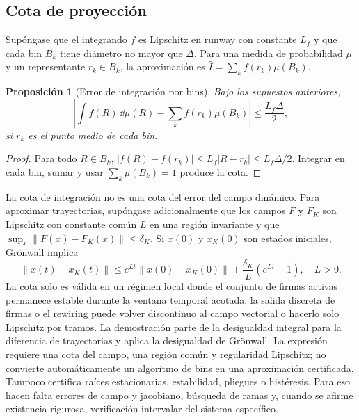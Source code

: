 \documentclass[11pt,a4paper]{article}
\newtheorem{proposition}[theorem]{Proposición}
\begin{document}
\subsection{Cota de proyección}
Supóngase que el integrando $f$ es Lipschitz en runway con constante $L_f$ y que cada bin $B_k$ tiene diámetro no mayor que $\Delta$. Para una medida de probabilidad $\mu$ y un representante $r_k\in B_k$, la aproximación es $\widehat I=\sum_k f(r_k)\mu(B_k)$.
\begin{proposition}[Error de integración por bins]
Bajo los supuestos anteriores,
\begin{equation}
\left|\int f(R)\,\dd\mu(R)-\sum_k f(r_k)\mu(B_k)\right|\leq\frac{L_f\Delta}{2}, \label{eq:binbound}
\end{equation}
si $r_k$ es el punto medio de cada bin.
\end{proposition}
\begin{proof}
Para todo $R\in B_k$, $|f(R)-f(r_k)|\leq L_f|R-r_k|\leq L_f\Delta/2$. Integrar en cada bin, sumar y usar $\sum_k\mu(B_k)=1$ produce la cota.\end{proof}

La cota de integración no es una cota del error del campo dinámico. Para aproximar trayectorias, supóngase adicionalmente que los campos $F$ y $F_K$ son Lipschitz con constante común $L$ en una región invariante y que $\sup_x\|F(x)-F_K(x)\|\leq\delta_K$. Si $x(0)$ y $x_K(0)$ son estados iniciales, Grönwall implica
\begin{equation}
\|x(t)-x_K(t)\|\leq e^{Lt}\|x(0)-x_K(0)\|+\frac{\delta_K}{L}(e^{Lt}-1),\quad L>0. \label{eq:gronwall}
\end{equation}
La cota solo es válida en un régimen local donde el conjunto de firmas activas permanece estable durante la ventana temporal acotada; la salida discreta de firmas o el rewiring puede volver discontinuo al campo vectorial o hacerlo solo Lipschitz por tramos. La demostración parte de la desigualdad integral para la diferencia de trayectorias y aplica la desigualdad de Grönwall. La expresión requiere una cota del campo, una región común y regularidad Lipschitz; no convierte automáticamente un algoritmo de bins en una aproximación certificada. Tampoco certifica raíces estacionarias, estabilidad, pliegues o histéresis. Para eso hacen falta errores de campo y jacobiano, búsqueda de ramas y, cuando se afirme existencia rigurosa, verificación intervalar del sistema específico.
\end{document}
